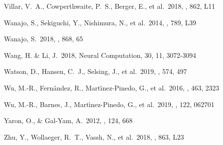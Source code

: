 \documentclass[twocolumn]{aastex63}
\begin{document}
\begin{thebibliography}{}

 Villar, V.~A., Cowperthwaite, P.~S., Berger, E., et al.\ 2018, \apjl, 862, L11



 Wanajo, S., Sekiguchi, Y., Nishimura, N., et al.\ 2014, \apjl, 789, L39

 Wanajo, S.\ 2018, \apj, 868, 65

 Wang, H. \& Li, J.\ 2018, Neural Computation, 30, 11, 3072-3094

 Watson, D., Hansen, C.~J., Selsing, J., et al.\ 2019, \nat, 574, 497

 Wu, M.-R., Fern{\'a}ndez, R., Mart{\'\i}nez-Pinedo, G., et al.\ 2016, \mnras, 463, 2323

 Wu, M.-R., Barnes, J., Mart{\'\i}nez-Pinedo, G., et al.\ 2019, \prl, 122, 062701

 Yaron, O., \& Gal-Yam, A.\ 2012, \pasp, 124, 668

 Zhu, Y., Wollaeger, R.~T., Vassh, N., et al.\ 2018, \apjl, 863, L23

\end{thebibliography}

\appendix{}
\end{document}
